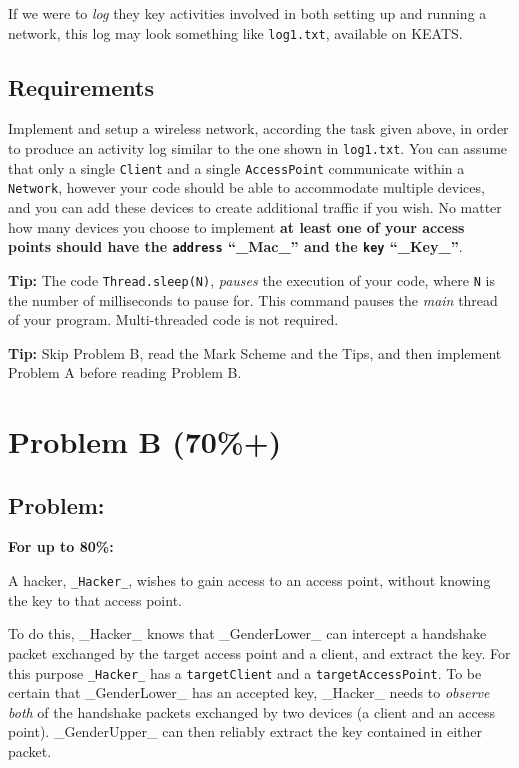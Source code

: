 \documentclass[11pt]{article}
\begin{document}
If we were to \emph{log} they key activities involved in both setting up and running a network, this log may look something like \texttt{log1.txt}, available on KEATS.

\subsection{Requirements}

Implement and setup a wireless network, according  the task given above, in order to produce an activity log similar to the one shown in \texttt{log1.txt}. You can assume that only a single \texttt{Client} and a single \texttt{AccessPoint} communicate within a \texttt{Network}, however your code should be able to accommodate multiple devices, and you can add these devices to create additional traffic if you wish. No matter how many devices you choose to implement \textbf{at least one of your access points should have the \texttt{address} ``_Mac_'' and the \texttt{key} ``_Key_''}.

\textbf{Tip:} The code \texttt{Thread.sleep(N)}, \emph{pauses} the execution of your code, where \texttt{N} is the number of milliseconds to pause for. This command pauses the \emph{main} thread of your program. Multi-threaded code is not required.

\textbf{Tip:} Skip Problem B, read the Mark Scheme and the Tips, and then implement Problem A before reading Problem B.

\section{Problem B (70\%+)}

\subsection{Problem:}

\textbf{For up to 80\%:}

A hacker, \texttt{_Hacker_}, wishes to gain access to an access point, without knowing the key to that access point. 

To do this, _Hacker_ knows that _GenderLower_ can intercept a handshake packet exchanged by the target access point and a client, and extract the key. For this purpose \texttt{_Hacker_} has a \texttt{targetClient} and a \texttt{targetAccessPoint}. To be certain that _GenderLower_ has an accepted key, _Hacker_ needs to \emph{observe} \emph{both} of the handshake packets exchanged by two devices (a client and an access point). _GenderUpper_ can then reliably extract the key contained in either packet. 
\end{document}
